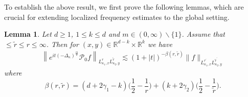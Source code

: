 \documentclass[a4paper,11pt, reqno]{amsart}
\newtheorem{lem}[theorem]{Lemma}
\theoremstyle{definition}
\theoremstyle{remark}
\numberwithin{equation}{section}
\begin{document}
	
 To establish the above result, we first prove the following lemmas, which are crucial for extending localized frequency estimates to the global setting.
 \begin{lem}\label{Deq6}
		Let $d \geq 1 $, $1 \leq k \leq d$ and $m\in (0, \infty)\backslash \{1\}$.  Assume that $ \leq \widetilde{r} \leq r \leq \infty$. Then for $(x, y) \in \mathbb{R}^{d-k} \times \mathbb{R}^k$ we have
		\begin{align}\label{Deq5}
			\left\|e^{i t(-\Delta_\kappa)^{\frac{m}{2}}} \mathcal{P}_0 f\right\|_{L_{\kappa_1, x}^r L_{\kappa_2, y}^{\tilde{r}}} \lesssim(1+|t|)^{-\beta(r, \widetilde{r})}\|f\|_{L_{\kappa_1, x}^{r^{\prime}} L_{\kappa_2, y}^{\tilde{r}^{\prime}}}
		\end{align}
		where $$\beta(r, \widetilde{r})= (d+2\gamma_1-k) \Big(\frac{1}{2}-\frac{1}{r}\Big) + (k+2\gamma_2)\Big(\frac{1}{2}-\frac{1}{\widetilde{r}}\Big).$$
	\end{lem} 
\end{document}
